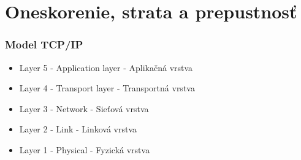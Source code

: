 \documentclass[10pt,xcolor=pdflatex,hyperref={unicode}]{beamer}
\begin{document}
    \section{Oneskorenie, strata a prepustnosť}
    \begin{frame}\frametitle{Model TCP/IP}
    \begin{itemize}
        \item Layer 5 - Application layer - Aplikačná vrstva
        \item Layer 4 - Transport layer - Transportná vrstva
        \item Layer 3 - Network - Sieťová vrstva
        \item Layer 2 - Link - Linková vrstva
        \item Layer 1 - Physical - Fyzická vrstva
    \end{itemize}
    \end{frame}


\end{document}
